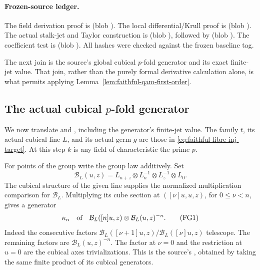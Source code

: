 \paragraph{Frozen-source ledger.}
The field derivation proof is
(blob ).
The local differential/Krull proof is
(blob ).
The actual stalk-jet and Taylor construction is
(blob ),
followed by 
(blob ).
The coefficient test is
(blob ).
All hashes were checked against the frozen baseline tag.

The next join is the source's global cubical \(p\)-fold
generator and its exact finite-jet value.
That join, rather than the purely formal derivative
calculation alone, is what permits applying
Lemma~\ref{lem:faithful-qam-first-order}.

\subsection{The actual cubical \(p\)-fold generator}
\label{subsec:faithful-pfold-generator}

We now translate  and
, including the generator's finite-jet
value.  The family \(t\), its actual cubical line \(L\),
and its actual germ \(g\) are those in
\eqref{eq:faithful-fibre-inj-target}.
At this step \(k\) is any field of characteristic the prime \(p\).

For points of the group write the group law additively.
Set
\[
 \mathcal B_L(u,z)
       =L_{u+z}\otimes L_u^{-1}\otimes L_z^{-1}\otimes L_0.
\]
The cubical structure of the given line supplies the
normalized multiplication comparison for \(\mathcal B_L\).
Multiplying its cube section at
\(([\nu]u,u,z)\), for \(0\le\nu<n\), gives a generator
\[
 \kappa_n\quad\hbox{of}\quad
            \mathcal B_L([n]u,z)\otimes
                                     \mathcal B_L(u,z)^{-n}.
 \tag{FG1}\label{eq:faithful-kappa-line}
\]
Indeed the consecutive factors
\(\mathcal B_L([\nu+1]u,z)/\mathcal B_L([\nu]u,z)\)
telescope.  The remaining factors are
\(\mathcal B_L(u,z)^{-n}\).
The factor at \(\nu=0\) and the restriction at \(u=0\)
are the cubical axes trivializations.
This is the source's , obtained by
taking the same finite product of its cubical generators.

